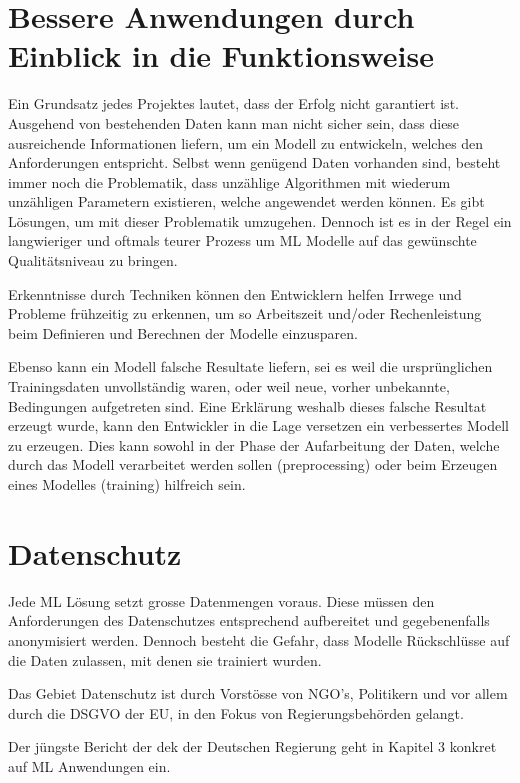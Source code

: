 \documentclass[
  12pt, %
  a4paper, %
  oneside, %
  openany, 
  numbers=noenddot, %
  BCOR=5mm, %
  parskip=half*, %
  thesis, %
]{bfhbook}
\begin{document}
\section{Bessere Anwendungen durch Einblick in die Funktionsweise}
Ein Grundsatz jedes  Projektes lautet, dass der Erfolg nicht garantiert ist. Ausgehend von bestehenden Daten kann man nicht sicher sein, dass diese ausreichende Informationen liefern, um ein Modell zu entwickeln, welches den Anforderungen entspricht. Selbst wenn genügend Daten vorhanden sind, besteht immer noch die Problematik, dass unzählige Algorithmen mit wiederum unzähligen Parametern existieren, welche angewendet werden können. Es gibt Lösungen, um mit dieser Problematik umzugehen. Dennoch ist es in der Regel ein langwieriger und oftmals teurer Prozess um \Gls{ML} Modelle auf das gewünschte Qualitätsniveau zu bringen.

Erkenntnisse durch  Techniken können den Entwicklern helfen Irrwege und Probleme frühzeitig zu erkennen, um so Arbeitszeit und/oder Rechenleistung beim Definieren und Berechnen der Modelle einzusparen.

Ebenso kann ein Modell falsche Resultate liefern, sei es weil die ursprünglichen Trainingsdaten unvollständig waren, oder weil neue, vorher unbekannte, Bedingungen aufgetreten sind. Eine Erklärung weshalb dieses falsche Resultat erzeugt wurde, kann den Entwickler in die Lage versetzen ein verbessertes Modell zu erzeugen. Dies kann sowohl in der Phase der Aufarbeitung der Daten, welche durch das Modell verarbeitet werden sollen (preprocessing) oder beim Erzeugen eines Modelles (training) hilfreich sein.

\section{Datenschutz}
Jede \gls{ML} Lösung setzt grosse Datenmengen voraus. Diese müssen den Anforderungen des Datenschutzes entsprechend aufbereitet und gegebenenfalls anonymisiert werden. Dennoch besteht die Gefahr, dass Modelle Rückschlüsse auf die Daten zulassen, mit denen sie trainiert wurden.

Das Gebiet Datenschutz ist durch Vorstösse von NGO's, Politikern und vor allem durch die \acrfull{DSGVO} der EU, in den Fokus von Regierungsbehörden gelangt.

Der jüngste Bericht der \acrfull{dek} der Deutschen Regierung \cite{datenEthik} geht in Kapitel 3 konkret auf  \Gls{ML} Anwendungen ein.
\end{document}
